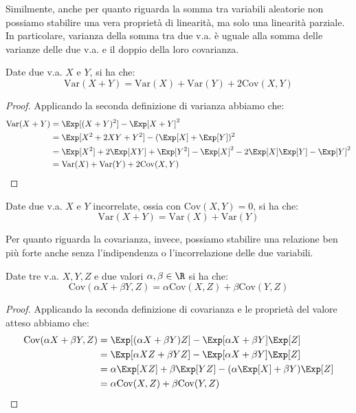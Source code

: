 \documentclass[a4paper, 12pt]{report}
\begin{document}
    Similmente, anche per quanto riguarda la somma tra variabili aleatorie non possiamo stabilire una vera proprietà di linearità, ma solo una linearità parziale. In particolare, varianza della somma tra due v.a. è uguale alla somma delle varianze delle due v.a. e il doppio della loro covarianza.
    
    \begin{framedprop}{}
        Date due v.a. $X$ e $Y$, si ha che:
        \[\mathrm{Var}(X+Y) = \mathrm{Var}(X) + \mathrm{Var}(Y) + 2\mathrm{Cov}(X,Y)\]
    \end{framedprop}

    \begin{proof}
        Applicando la seconda definizione di varianza abbiamo che:
        \[\begin{split}
            \mathrm{Var}(X+Y) &= \Exp[(X+Y)^2] - \Exp[X+Y]^2 \\
            &= \Exp[X^2+2XY+Y^2] - (\Exp[X]+\Exp[Y])^2 \\
            &= \Exp[X^2]+2\Exp[XY]+\Exp[Y^2] - \Exp[X]^2 - 2\Exp[X]\Exp[Y] - \Exp[Y]^2 \\
            &= \mathrm{Var}(X) + \mathrm{Var}(Y) + 2\mathrm{Cov}(X,Y)
        \end{split}\]
    \end{proof}

    \begin{framedcor}{}
        Date due v.a. $X$ e $Y$ incorrelate, ossia con $\mathrm{Cov}(X,Y) = 0$, si ha che:
        \[\mathrm{Var}(X+Y) = \mathrm{Var}(X) + \mathrm{Var}(Y)\]
    \end{framedcor}

    Per quanto riguarda la covarianza, invece, possiamo stabilire una relazione ben più forte anche senza l'indipendenza o l'incorrelazione delle due variabili.

    \begin{framedthm}{}
        Date tre v.a. $X, Y, Z$ e due valori $\alpha,\beta \in \R$ si ha che:
        \[\mathrm{Cov}(\alpha X + \beta Y, Z) = \alpha \mathrm{Cov}(X,Z) + \beta \mathrm{Cov}(Y,Z)\] 
    \end{framedthm}

    \begin{proof}
        Applicando la seconda definizione di covarianza e le proprietà del valore atteso abbiamo che:
        \[\begin{split}
            \mathrm{Cov}(\alpha X + \beta Y, Z) &= \Exp[(\alpha X + \beta Y) Z] - \Exp[\alpha X + \beta Y]\Exp[Z] \\
            &= \Exp[\alpha XZ + \beta Y Z] - \Exp[\alpha X + \beta Y]\Exp[Z] \\
            &= \alpha \Exp[XZ] + \beta \Exp[YZ] - (\alpha \Exp[X] + \beta Y)\Exp[Z] \\
            &= \alpha \mathrm{Cov}(X,Z) + \beta \mathrm{Cov}(Y,Z) \\
        \end{split}\]
    \end{proof}
\end{document}
